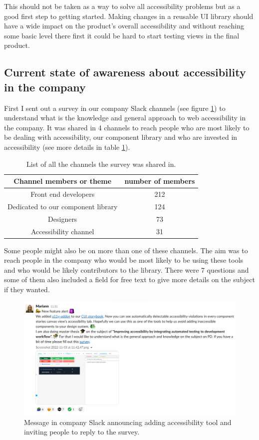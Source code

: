 \documentclass{master_thesis}
\begin{document}
This should not be taken as a way to solve all accessibility problems but as a good first step to getting started. Making changes in a reusable UI library should have a wide impact on the product's overall accessibility and without reaching some basic level there first it could be hard to start testing views in the final product.

\subsection{Current state of awareness about accessibility in the company}

First I sent out a survey in our company Slack channels (see figure \ref{fig:slack-message}) to understand what is the knowledge and general approach to web accessibility in the company. It was shared in 4 channels to reach people who are most likely to be dealing with accessibility, our component library and who are invested in accessibility (see more details in table \ref{table:survey-shared}).

\begin{table}[h]
	\centering
	\begin{tabular}{|c|c|}
		\hline
		\textbf{Channel members or theme} & \textbf{number of members}  \\
		\hline
		Front end developers  & 212  \\
		\hline
		Dedicated to our component library  & 124  \\
		\hline
		Designers  & 73  \\
		\hline
		Accessibility channel  & 31  \\
		\hline
	\end{tabular}
	\caption{List of all the channels the survey was shared in.}
	\label{table:survey-shared}
\end{table}

Some people might also be on more than one of these channels. The aim was to reach people in the company who would be most likely to be using these tools and who would be likely contributors to the library. There were 7 questions and some of them also included a field for free text to give more details on the subject if they wanted.

\begin{figure}[h]
	\includegraphics[width=\textwidth]{img/survey.png}
	\caption{Message in company Slack announcing adding accessibility tool and inviting people to reply to the survey.}
	\label{fig:slack-message}
\end{figure}
\end{document}
